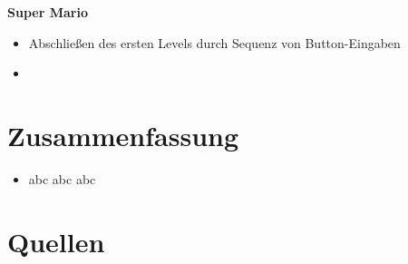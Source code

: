 %    
  
    
\begin{frame}

   \textbf{Super Mario}
   
   \begin{itemize}
   
    \item Abschließen des ersten Levels durch Sequenz von Button-Eingaben 
    \item 
   \end{itemize}
   
\end{frame}
    

    
    \section{Zusammenfassung}
     \begin{itemize}
      \item abc abc abc
    \end{itemize}
    
    \section{Quellen}
    
    
    
    


